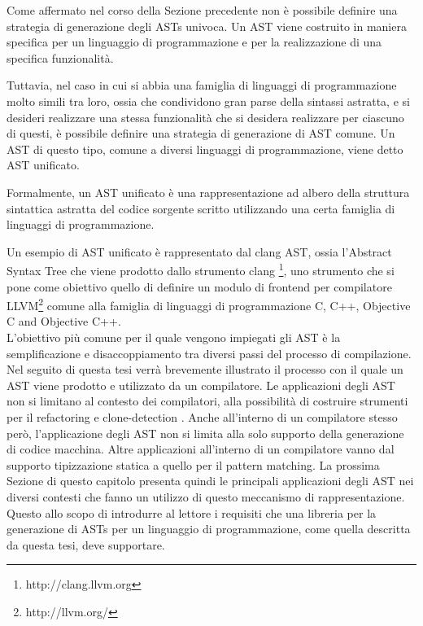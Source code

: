 Come affermato nel corso della Sezione precedente non è possibile definire una
strategia di generazione degli ASTs univoca. Un AST viene costruito in maniera
specifica per un linguaggio di programmazione e per la realizzazione di una
specifica funzionalità.

Tuttavia, nel caso in cui si abbia una famiglia di linguaggi di programmazione
molto simili tra loro, ossia che condividono gran parse della sintassi
astratta, e si desideri realizzare una stessa funzionalità che si desidera
realizzare per ciascuno di questi, è possibile definire una strategia di
generazione di AST comune. Un AST di questo tipo, comune a diversi linguaggi di
programmazione, viene detto AST unificato.

Formalmente, un AST unificato è una rappresentazione ad albero della struttura
sintattica astratta del codice sorgente scritto utilizzando una certa famiglia
di linguaggi di programmazione.

Un esempio di AST unificato è rappresentato dal clang AST, ossia l’Abstract
Syntax Tree che viene prodotto dallo strumento clang \footnote
{http://clang.llvm.org}, uno strumento che si pone come obiettivo quello di
definire un modulo di frontend per compilatore LLVM\footnote{http://llvm.org/}
comune alla famiglia di linguaggi di programmazione C, C++, Objective C and
Objective C++.\\

L’obiettivo più comune per il quale vengono impiegati gli AST è la
semplificazione e disaccoppiamento tra diversi passi del processo di
compilazione. Nel seguito di questa tesi verrà brevemente illustrato il
processo con il quale un AST viene prodotto e utilizzato da un compilatore. Le
applicazioni degli AST non si limitano al contesto dei compilatori, alla
possibilità di costruire strumenti per il refactoring \cite{jscodeshift2016} e
clone-detection \cite{DBLP:conf/saci/LazarB14}. Anche all’interno di un
compilatore stesso però, l’applicazione degli AST non si limita alla solo
supporto della generazione di codice macchina. Altre applicazioni all’interno
di un compilatore vanno dal supporto tipizzazione statica a quello per il
pattern matching. La prossima Sezione di questo capitolo presenta quindi le
principali applicazioni degli AST nei diversi contesti che fanno un utilizzo di
questo meccanismo di rappresentazione. Questo allo scopo di introdurre al
lettore i requisiti che una libreria per la generazione di ASTs per un
linguaggio di programmazione, come quella descritta da questa tesi, deve
supportare.\\

